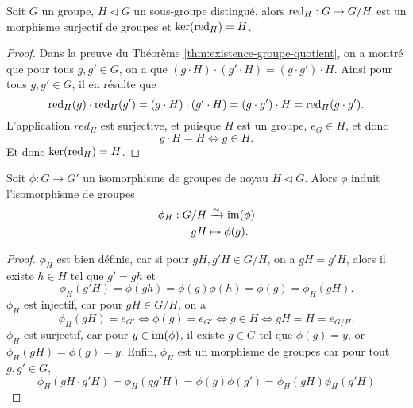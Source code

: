\begin{proposition}
	Soit $G$ un groupe, $H \triangleleft G$ un sous-groupe distingué,
	alors $\operatorname{red}_H : G \to G/H$ est un morphisme surjectif de groupes
	et $\ker(\operatorname{red}_H) = H$.
\end{proposition}

\begin{proof}	
	Dans la preuve du Théorème \ref{thm:existence-groupe-quotient},
	on a montré que pour tous
	$g, g' \in G$, on a que $(g \cdot H) \cdot (g' \cdot H) = (g \cdot g') \cdot H$.
	Ainsi pour tous $g, g' \in G$, il en résulte que
	\begin{equation*}
		\operatorname{red}_H(g) \cdot \operatorname{red}_H(g') = (g \cdot H) \cdot (g' \cdot H)
		= (g \cdot g') \cdot H = \operatorname{red}_H(g \cdot g').
	\end{equation*}
	L'application $red_H$ est surjective, et puisque $H$ est un groupe, $e_G \in H$,
	et donc
	\begin{equation*}
		g \cdot H = H \iff g \in H.	
	\end{equation*}
	Et donc $\ker(\operatorname{red}_H) = H$.
\end{proof}

\begin{theorem}
	\label{thm:noyau-image}
	Soit $\phi : G \to G'$ un isomorphisme de groupes de noyau $H \triangleleft G$.
	Alors $\phi$ induit l'isomorphisme de groupes
	\begin{align*}
		\phi_H: G/H &\xrightarrow{\sim} \operatorname{im}(\phi)\\
		g H &\mapsto \phi(g).
	\end{align*}
\end{theorem}

\begin{proof}
	$\phi_H$ est bien définie, car si pour $g H, g'H \in G/H$, on a $gH = g'H$,
	alors il existe $h \in H$ tel que $g' = gh$ et
	\begin{equation*}
		\phi_H(g'H) = \phi(gh) = \phi(g)\phi(h) = \phi(g) = \phi_H(gH).
	\end{equation*}
	$\phi_H$ est injectif, car pour $gH \in G/H$, on a
	\begin{equation*}
		\phi_H(gH) = e_{G'} \iff \phi(g) = e_{G'} \iff g \in H \iff gH = H = e_{G/H}.
	\end{equation*}
	$\phi_H$ est surjectif, car pour $y \in \operatorname{im}(\phi)$, il existe $g \in G$ 
	tel que $\phi(g) = y$, or $\phi_H(gH) = \phi(g) = y$.
	Enfin, $\phi_H$ est un morphisme de groupes car pour tout $g, g' \in G$,
	\begin{equation*}
		\phi_H(gH \cdot g'H) = \phi_H(gg'H) = \phi(g)\phi(g') = \phi_H(gH)\phi_H(g'H)
	\end{equation*}
\end{proof}

